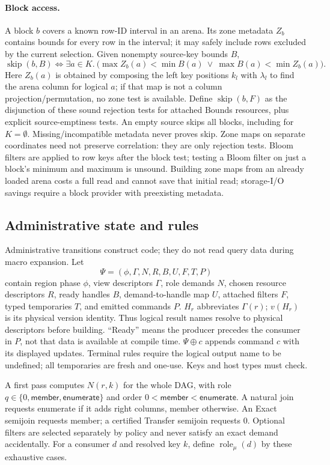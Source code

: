 \paragraph{Block access.}
A block $b$ covers a known row-ID interval in an arena. Its zone metadata $Z_b$
contains bounds for every row in the interval; it may safely include rows
excluded by the current selection. Given nonempty source-key bounds $B$,
\[
 \operatorname{skip}(b,B)\iff
 \exists a\in K.\ \bigl(\max Z_b(a)<\min B(a)\ \lor\
                         \max B(a)<\min Z_b(a)\bigr).
\]
Here $Z_b(a)$ is obtained by composing the left key positions $k_l$ with
$\lambda_l$ to find the arena column for logical $a$; if that map is not a
column projection/permutation, no zone test is available. Define
$\operatorname{skip}(b,F)$ as the disjunction of these sound rejection tests
for attached Bounds resources, plus explicit source-emptiness tests.
An empty source skips all blocks, including for $K=\emptyset$.
Missing/incompatible metadata never proves skip. Zone maps on separate
coordinates need not preserve correlation: they are only rejection tests.
Bloom filters are applied to row keys after the block test; testing a Bloom
filter on just a block's minimum and maximum is unsound. Building zone maps
from an already loaded arena costs a full read and cannot save that initial
read; storage-I/O savings require a block provider with preexisting metadata.

\subsection{Administrative state and rules}
\label{sec:ya-admin}
Administrative transitions construct code; they do not read query data during
macro expansion. Let
\[
 \Psi=(\phi,\Gamma,N,R,B,U,F,T,P)
\]
contain region phase $\phi$, view descriptors $\Gamma$, role demands $N$,
chosen resource descriptors $R$, ready handles $B$, demand-to-handle map $U$,
attached filters $F$, typed temporaries $T$, and emitted commands $P$.
$H_r$ abbreviates $\Gamma(r)$; $v(H_r)$ is its physical version identity.
Thus logical result names resolve to physical descriptors before building.
``Ready'' means the producer precedes the consumer in $P$, not that data is
available at compile time. $\Psi\oplus c$ appends command $c$ with its displayed
updates. Terminal rules require the logical output name to be undefined;
all temporaries are fresh and one-use. Keys and host types must check.

A first pass computes $N(r,k)$ for the whole DAG, with role
$q\in\{0,\mathsf{member},\mathsf{enumerate}\}$ and order
$0<\mathsf{member}<\mathsf{enumerate}$. A natural join requests enumerate if
it adds right columns, member otherwise. An Exact semijoin requests member;
a certified Transfer semijoin requests $0$. Optional filters are selected
separately by policy and never satisfy an exact demand accidentally.
For a consumer $d$ and resolved key $k$, define
$\operatorname{role}_{\mu}(d)$ by these exhaustive cases.

